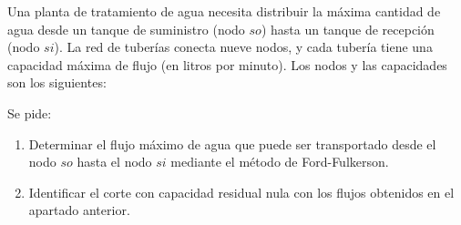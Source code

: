 Una planta de tratamiento de agua necesita distribuir la máxima cantidad de agua desde un tanque de suministro (nodo \(so\)) hasta un tanque de recepción (nodo \(si\)). La red de tuberías conecta nueve nodos, y cada tubería tiene una capacidad máxima de flujo (en litros por minuto). Los nodos y las capacidades son los siguientes:

\begin{center}
\end{center}

Se pide:
\begin{enumerate}
    \item Determinar el flujo máximo de agua que puede ser transportado desde el nodo \(so\) hasta el nodo \(si\) mediante el método de Ford-Fulkerson.
    \item Identificar el corte con capacidad residual nula con los flujos obtenidos en el apartado anterior.
\end{enumerate}

